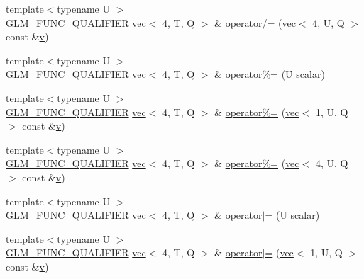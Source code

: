 \begin{DoxyCompactItemize}
{\footnotesize template$<$typename U $>$ }\\\mbox{\hyperlink{setup_8hpp_a33fdea6f91c5f834105f7415e2a64407}{G\+L\+M\+\_\+\+F\+U\+N\+C\+\_\+\+Q\+U\+A\+L\+I\+F\+I\+ER}} \mbox{\hyperlink{structglm_1_1vec}{vec}}$<$ 4, T, Q $>$ \& \mbox{\hyperlink{structglm_1_1vec_3_014_00_01_t_00_01_q_01_4_aa9830c51f8b9bfc55e3d670007358be0}{operator/=}} (\mbox{\hyperlink{structglm_1_1vec}{vec}}$<$ 4, U, Q $>$ const \&\mbox{\hyperlink{_s_d_l__opengl_8h_a10a82eabcb59d2fcd74acee063775f90}{v}})
\item 
{\footnotesize template$<$typename U $>$ }\\\mbox{\hyperlink{setup_8hpp_a33fdea6f91c5f834105f7415e2a64407}{G\+L\+M\+\_\+\+F\+U\+N\+C\+\_\+\+Q\+U\+A\+L\+I\+F\+I\+ER}} \mbox{\hyperlink{structglm_1_1vec}{vec}}$<$ 4, T, Q $>$ \& \mbox{\hyperlink{structglm_1_1vec_3_014_00_01_t_00_01_q_01_4_ab18a2c7d078b35f9b8043ec429805577}{operator\%=}} (U scalar)
\item 
{\footnotesize template$<$typename U $>$ }\\\mbox{\hyperlink{setup_8hpp_a33fdea6f91c5f834105f7415e2a64407}{G\+L\+M\+\_\+\+F\+U\+N\+C\+\_\+\+Q\+U\+A\+L\+I\+F\+I\+ER}} \mbox{\hyperlink{structglm_1_1vec}{vec}}$<$ 4, T, Q $>$ \& \mbox{\hyperlink{structglm_1_1vec_3_014_00_01_t_00_01_q_01_4_a14fc67ccd918340ef8c1c1f584e8a4bb}{operator\%=}} (\mbox{\hyperlink{structglm_1_1vec}{vec}}$<$ 1, U, Q $>$ const \&\mbox{\hyperlink{_s_d_l__opengl_8h_a10a82eabcb59d2fcd74acee063775f90}{v}})
\item 
{\footnotesize template$<$typename U $>$ }\\\mbox{\hyperlink{setup_8hpp_a33fdea6f91c5f834105f7415e2a64407}{G\+L\+M\+\_\+\+F\+U\+N\+C\+\_\+\+Q\+U\+A\+L\+I\+F\+I\+ER}} \mbox{\hyperlink{structglm_1_1vec}{vec}}$<$ 4, T, Q $>$ \& \mbox{\hyperlink{structglm_1_1vec_3_014_00_01_t_00_01_q_01_4_a6f41e8cbca8438ff8a864f913f2801b2}{operator\%=}} (\mbox{\hyperlink{structglm_1_1vec}{vec}}$<$ 4, U, Q $>$ const \&\mbox{\hyperlink{_s_d_l__opengl_8h_a10a82eabcb59d2fcd74acee063775f90}{v}})
\item 
{\footnotesize template$<$typename U $>$ }\\\mbox{\hyperlink{setup_8hpp_a33fdea6f91c5f834105f7415e2a64407}{G\+L\+M\+\_\+\+F\+U\+N\+C\+\_\+\+Q\+U\+A\+L\+I\+F\+I\+ER}} \mbox{\hyperlink{structglm_1_1vec}{vec}}$<$ 4, T, Q $>$ \& \mbox{\hyperlink{structglm_1_1vec_3_014_00_01_t_00_01_q_01_4_abe08fcb3638c6605f6b404ca5c4621d5}{operator$\vert$=}} (U scalar)
\item 
{\footnotesize template$<$typename U $>$ }\\\mbox{\hyperlink{setup_8hpp_a33fdea6f91c5f834105f7415e2a64407}{G\+L\+M\+\_\+\+F\+U\+N\+C\+\_\+\+Q\+U\+A\+L\+I\+F\+I\+ER}} \mbox{\hyperlink{structglm_1_1vec}{vec}}$<$ 4, T, Q $>$ \& \mbox{\hyperlink{structglm_1_1vec_3_014_00_01_t_00_01_q_01_4_a3d9704513aa8df8d05bc30d20dd6bc71}{operator$\vert$=}} (\mbox{\hyperlink{structglm_1_1vec}{vec}}$<$ 1, U, Q $>$ const \&\mbox{\hyperlink{_s_d_l__opengl_8h_a10a82eabcb59d2fcd74acee063775f90}{v}})

\end{DoxyCompactItemize}
